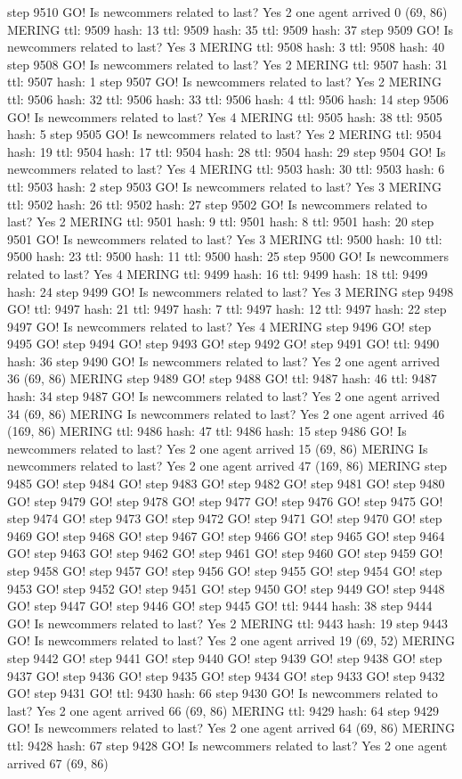 step 9510 GO! Is newcommers related to last? Yes 2 one agent arrived 0 (69, 86) MERING ttl: 9509 hash: 13 ttl: 9509 hash: 35 ttl: 9509 hash: 37 step 9509 GO! Is newcommers related to last? Yes 3 MERING ttl: 9508 hash: 3 ttl: 9508 hash: 40 step 9508 GO! Is newcommers related to last? Yes 2 MERING ttl: 9507 hash: 31 ttl: 9507 hash: 1 step 9507 GO! Is newcommers related to last? Yes 2 MERING ttl: 9506 hash: 32 ttl: 9506 hash: 33 ttl: 9506 hash: 4 ttl: 9506 hash: 14 step 9506 GO! Is newcommers related to last? Yes 4 MERING ttl: 9505 hash: 38 ttl: 9505 hash: 5 step 9505 GO! Is newcommers related to last? Yes 2 MERING ttl: 9504 hash: 19 ttl: 9504 hash: 17 ttl: 9504 hash: 28 ttl: 9504 hash: 29 step 9504 GO! Is newcommers related to last? Yes 4 MERING ttl: 9503 hash: 30 ttl: 9503 hash: 6 ttl: 9503 hash: 2 step 9503 GO! Is newcommers related to last? Yes 3 MERING ttl: 9502 hash: 26 ttl: 9502 hash: 27 step 9502 GO! Is newcommers related to last? Yes 2 MERING ttl: 9501 hash: 9 ttl: 9501 hash: 8 ttl: 9501 hash: 20 step 9501 GO! Is newcommers related to last? Yes 3 MERING ttl: 9500 hash: 10 ttl: 9500 hash: 23 ttl: 9500 hash: 11 ttl: 9500 hash: 25 step 9500 GO! Is newcommers related to last? Yes 4 MERING ttl: 9499 hash: 16 ttl: 9499 hash: 18 ttl: 9499 hash: 24 step 9499 GO! Is newcommers related to last? Yes 3 MERING step 9498 GO! ttl: 9497 hash: 21 ttl: 9497 hash: 7 ttl: 9497 hash: 12 ttl: 9497 hash: 22 step 9497 GO! Is newcommers related to last? Yes 4 MERING step 9496 GO! step 9495 GO! step 9494 GO! step 9493 GO! step 9492 GO! step 9491 GO! ttl: 9490 hash: 36 step 9490 GO! Is newcommers related to last? Yes 2 one agent arrived 36 (69, 86) MERING step 9489 GO! step 9488 GO! ttl: 9487 hash: 46 ttl: 9487 hash: 34 step 9487 GO! Is newcommers related to last? Yes 2 one agent arrived 34 (69, 86) MERING Is newcommers related to last? Yes 2 one agent arrived 46 (169, 86) MERING ttl: 9486 hash: 47 ttl: 9486 hash: 15 step 9486 GO! Is newcommers related to last? Yes 2 one agent arrived 15 (69, 86) MERING Is newcommers related to last? Yes 2 one agent arrived 47 (169, 86) MERING step 9485 GO! step 9484 GO! step 9483 GO! step 9482 GO! step 9481 GO! step 9480 GO! step 9479 GO! step 9478 GO! step 9477 GO! step 9476 GO! step 9475 GO! step 9474 GO! step 9473 GO! step 9472 GO! step 9471 GO! step 9470 GO! step 9469 GO! step 9468 GO! step 9467 GO! step 9466 GO! step 9465 GO! step 9464 GO! step 9463 GO! step 9462 GO! step 9461 GO! step 9460 GO! step 9459 GO! step 9458 GO! step 9457 GO! step 9456 GO! step 9455 GO! step 9454 GO! step 9453 GO! step 9452 GO! step 9451 GO! step 9450 GO! step 9449 GO! step 9448 GO! step 9447 GO! step 9446 GO! step 9445 GO! ttl: 9444 hash: 38 step 9444 GO! Is newcommers related to last? Yes 2 MERING ttl: 9443 hash: 19 step 9443 GO! Is newcommers related to last? Yes 2 one agent arrived 19 (69, 52) MERING step 9442 GO! step 9441 GO! step 9440 GO! step 9439 GO! step 9438 GO! step 9437 GO! step 9436 GO! step 9435 GO! step 9434 GO! step 9433 GO! step 9432 GO! step 9431 GO! ttl: 9430 hash: 66 step 9430 GO! Is newcommers related to last? Yes 2 one agent arrived 66 (69, 86) MERING ttl: 9429 hash: 64 step 9429 GO! Is newcommers related to last? Yes 2 one agent arrived 64 (69, 86) MERING ttl: 9428 hash: 67 step 9428 GO! Is newcommers related to last? Yes 2 one agent arrived 67 (69, 86) 
